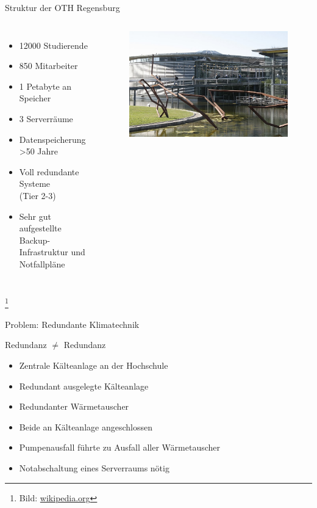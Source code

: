 \documentclass[10pt]{beamer}
\newcommand\blfootnote[1]{%
	\begingroup
	\renewcommand\thefootnote{}\footnote{#1}%
	\addtocounter{footnote}{-1}%
	\endgroup
}
\begin{document}
%
%
\begin{frame}[fragile]{Struktur der OTH Regensburg}
\begin{columns}[T,c,onlytextwidth]
	\begin{itemize}
		\item 12000 Studierende
		\item 850 Mitarbeiter
		\item 1 Petabyte an Speicher
		\item 3 Serverräume
		\item Datenspeicherung \textgreater 50 Jahre
		\item Voll redundante Systeme \\(Tier 2-3)
		\item Sehr gut aufgestellte Backup-Infrastruktur und Notfallpläne
	\end{itemize}
	\begin{figure}
		\includegraphics[width=1\textwidth]{images/oth}
	\end{figure}
\end{columns}

\blfootnote{Bild: \href{https://de.wikipedia.org/wiki/Datei:OTH_Regensburg_01.jpg}{wikipedia.org}}
\end{frame}

%
%
\begin{frame}[fragile]{Problem: Redundante Klimatechnik}
\begin{alertblock}{Redundanz $\neq$ Redundanz}
\end{alertblock}
\begin{itemize}
	\item Zentrale Kälteanlage an der Hochschule
	\item Redundant ausgelegte Kälteanlage
	\item Redundanter Wärmetauscher
	\item Beide an Kälteanlage angeschlossen
	\item Pumpenausfall führte zu Ausfall aller Wärmetauscher
	\item Notabschaltung eines Serverraums nötig
\end{itemize}
\end{frame}
\end{document}
